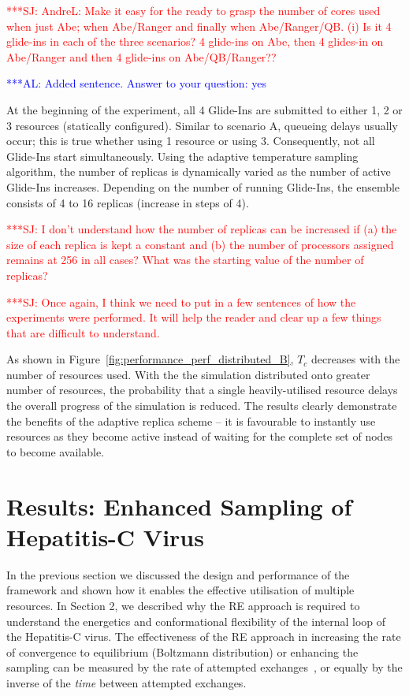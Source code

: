\documentclass{rspublic}
\newcommand{\alnote}[1]{ {\textcolor{blue} { ***AL: #1 }}}
\newcommand{\jhanote}[1]{ {\textcolor{red} { ***SJ: #1 }}}
\newcommand{\alnote}[1]{}
\newcommand{\jhanote}[1]{}
\begin{document}
\jhanote{AndreL: Make it easy for the ready to grasp the number of
  cores used when just Abe; when Abe/Ranger and finally when
  Abe/Ranger/QB. (i) Is it 4 glide-ins in each of the three scenarios?
  4 glide-ins on Abe, then 4 glides-in on Abe/Ranger and then 4
  glide-ins on Abe/QB/Ranger??}

\alnote{Added sentence. Answer to your question: yes}
              
At the beginning of the experiment, all 4 Glide-Ins are submitted to
either 1, 2 or 3 resources (statically configured).  Similar to
scenario A, queueing delays usually occur; this is true whether using
1 resource or using 3.  Consequently, not all Glide-Ins start
simultaneously.  Using the adaptive temperature sampling algorithm,
the number of replicas is dynamically varied as the number of active
Glide-Ins increases. Depending on the number of running Glide-Ins, the
ensemble consists of 4 to 16 replicas (increase in
steps of 4).

\jhanote{I don't understand how the number of replicas can be
  increased if (a) the size of each replica is kept a constant and (b)
  the number of processors assigned remains at 256 in all cases? What
  was the starting value of the number of replicas?}  

\jhanote{Once again, I think we need to put in a few sentences of how
  the experiments were performed. It will help the reader and clear up
  a few things that are difficult to understand.}

As shown in Figure~\ref{fig:performance_perf_distributed_B}, $T_{c}$
decreases with the number of resources used.  With the the simulation
distributed onto greater number of resources, the probability that a
single heavily-utilised resource delays the overall progress of the
simulation is reduced.
The results clearly demonstrate the benefits of the adaptive replica
scheme -- it is favourable to instantly use resources as they become
active instead of waiting for the complete set of nodes to become
available.  

\section{Results: Enhanced Sampling of Hepatitis-C Virus}
In the previous section we discussed the design and performance
of the framework and shown how it enables the effective utilisation of
multiple resources. In Section 2, we described why the RE approach is
required to understand the energetics and conformational flexibility
of the internal loop of the Hepatitis-C virus. The effectiveness of
the RE approach in increasing the rate of convergence to equilibrium
(Boltzmann distribution) or enhancing the sampling can be measured by
the rate of attempted exchanges~\citep{Lei:2007xe}, or equally by the
inverse of the {\it time} between attempted exchanges.
\end{document}
